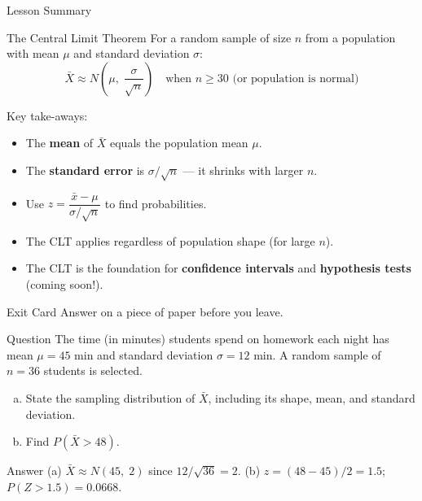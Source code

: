\documentclass[aspectratio=169]{beamer}
\begin{document}
\begin{frame}{Lesson Summary}
    \begin{block}{The Central Limit Theorem}
        For a random sample of size $n$ from a population with mean $\mu$ and
        standard deviation $\sigma$:
        \[
            \bar{X} \approx N\!\left(\mu,\; \frac{\sigma}{\sqrt{n}}\right)
            \quad \text{when } n \geq 30 \text{ (or population is normal)}
        \]
    \end{block}
    \medskip
    Key take-aways:
    \begin{itemize}
        \item The \textbf{mean} of $\bar{X}$ equals the population mean $\mu$.
        \item The \textbf{standard error} is $\sigma/\sqrt{n}$ --- it shrinks with larger $n$.
        \item Use $z = \dfrac{\bar{x} - \mu}{\sigma/\sqrt{n}}$ to find probabilities.
        \item The CLT applies regardless of population shape (for large $n$).
        \item The CLT is the foundation for \textbf{confidence intervals} and
              \textbf{hypothesis tests} (coming soon!).
    \end{itemize}
\end{frame}

\begin{frame}{Exit Card}
    Answer on a piece of paper before you leave.
    \begin{alertblock}{Question}
        The time (in minutes) students spend on homework each night has mean
        $\mu = 45$ min and standard deviation $\sigma = 12$ min.  A random sample of
        $n = 36$ students is selected.
        \begin{enumerate}[(a)]
            \item State the sampling distribution of $\bar{X}$, including its shape, mean,
                  and standard deviation.
            \item Find $P(\bar{X} > 48)$.
        \end{enumerate}
    \end{alertblock}
    \bigskip
    \begin{block}{Answer}
        (a) $\bar{X} \approx N(45,\; 2)$ since $12/\sqrt{36} = 2$.\quad
        (b) $z = (48-45)/2 = 1.5$;\quad $P(Z > 1.5) = 0.0668$.
    \end{block}
\end{frame}
\end{document}
